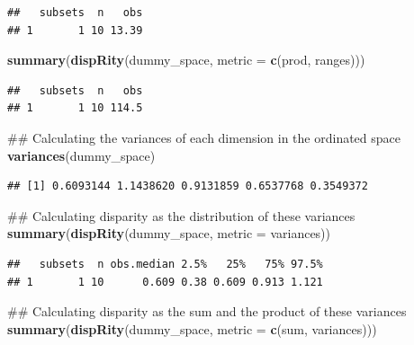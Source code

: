 \documentclass[]{book}
\newenvironment{Shaded}{\begin{snugshade}}{\end{snugshade}}
\newcommand{\KeywordTok}[1]{\textcolor[rgb]{0.13,0.29,0.53}{\textbf{#1}}}
\newcommand{\DataTypeTok}[1]{\textcolor[rgb]{0.13,0.29,0.53}{#1}}
\newcommand{\NormalTok}[1]{#1}
\theoremstyle{definition}
\theoremstyle{definition}
\theoremstyle{remark}
\begin{document}
\begin{verbatim}
##   subsets  n   obs
## 1       1 10 13.39
\end{verbatim}

\begin{Shaded}
\begin{Highlighting}[]
\KeywordTok{summary}\NormalTok{(}\KeywordTok{dispRity}\NormalTok{(dummy_space, }\DataTypeTok{metric =} \KeywordTok{c}\NormalTok{(prod, ranges)))}
\end{Highlighting}
\end{Shaded}

\begin{verbatim}
##   subsets  n   obs
## 1       1 10 114.5
\end{verbatim}

\begin{Shaded}
\begin{Highlighting}[]
\NormalTok{## Calculating the variances of each dimension in the ordinated space}
\KeywordTok{variances}\NormalTok{(dummy_space)}
\end{Highlighting}
\end{Shaded}

\begin{verbatim}
## [1] 0.6093144 1.1438620 0.9131859 0.6537768 0.3549372
\end{verbatim}

\begin{Shaded}
\begin{Highlighting}[]
\NormalTok{## Calculating disparity as the distribution of these variances}
\KeywordTok{summary}\NormalTok{(}\KeywordTok{dispRity}\NormalTok{(dummy_space, }\DataTypeTok{metric =}\NormalTok{ variances))}
\end{Highlighting}
\end{Shaded}

\begin{verbatim}
##   subsets  n obs.median 2.5%   25%   75% 97.5%
## 1       1 10      0.609 0.38 0.609 0.913 1.121
\end{verbatim}

\begin{Shaded}
\begin{Highlighting}[]
\NormalTok{## Calculating disparity as the sum and the product of these variances}
\KeywordTok{summary}\NormalTok{(}\KeywordTok{dispRity}\NormalTok{(dummy_space, }\DataTypeTok{metric =} \KeywordTok{c}\NormalTok{(sum, variances)))}
\end{Highlighting}
\end{Shaded}
\end{document}
